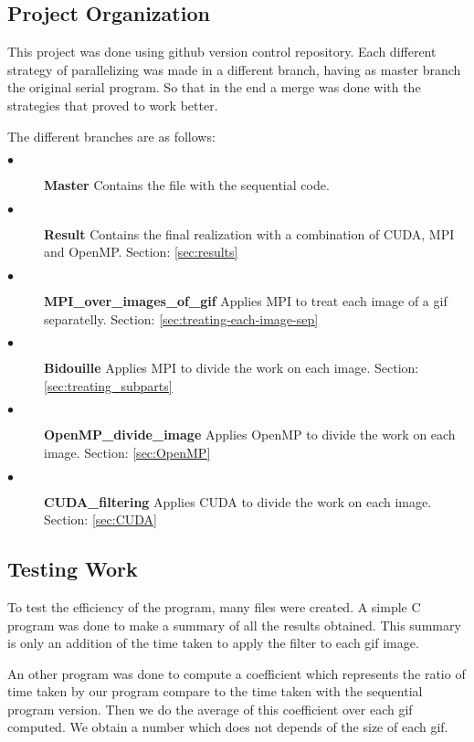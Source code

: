\documentclass[conference,compsoc]{IEEEtran}
\begin{document}
\subsection{Project Organization}
This project was done using github version control repository. Each different strategy of parallelizing was made in a different branch, having as master branch the original serial program. So that in the end a merge was done with the strategies that proved to work better.

The different branches are as follows:
\begin{description}
	\item[$\bullet$] \textbf{Master} Contains the file with the sequential code.
	\item[$\bullet$] \textbf{Result} Contains the final realization with a combination of CUDA, MPI and OpenMP. Section: \ref{sec:results}
	\item[$\bullet$] \textbf{MPI\_over\_images\_of\_gif} Applies MPI to treat each image of a gif separatelly. Section: \ref{sec:treating-each-image-sep}
	\item[$\bullet$] \textbf{Bidouille} Applies MPI to divide the work on each image. Section: \ref{sec:treating_subparts}
	\item[$\bullet$] \textbf{OpenMP\_divide\_image} Applies OpenMP to divide the work on each image. Section: \ref{sec:OpenMP}
	\item[$\bullet$] \textbf{CUDA\_filtering} Applies CUDA to divide the work on each image. Section: \ref{sec:CUDA}
\end{description}


\subsection{Testing Work}
To test the efficiency of the program, many files were created. A simple C program was done to make a summary of all the results obtained. This summary is only an addition of the time taken to apply the filter to each gif image.

An other program was done to compute a coefficient which represents the ratio of time taken by our program compare to the time taken with the sequential program version. Then we do the average of this coefficient over each gif computed. We obtain a number which does not depends of the size of each gif.
\end{document}
